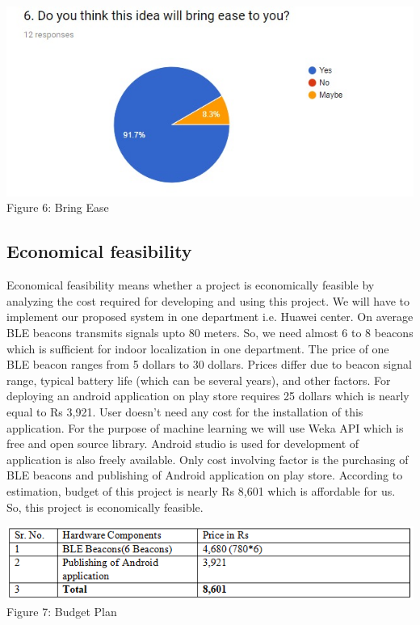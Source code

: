 \documentclass{article}
\begin{document}
\begin{center}
\includegraphics[scale=0.7]{graph6}
\\Figure 6: Bring Ease
\end{center}

 

\subsection{Economical feasibility}

Economical feasibility means whether a project is economically feasible by analyzing the cost required for developing and using this project. We will have to implement our proposed system in one department i.e. Huawei center. On average BLE beacons transmits signals upto 80 meters. So, we need almost 6 to 8 beacons which is sufficient for indoor localization in one department. The price of one BLE beacon ranges from 5 dollars to 30 dollars. Prices differ due to beacon signal range, typical battery life (which can be several years), and other factors. For deploying an android application on play store requires 25 dollars which is nearly equal to Rs 3,921. User doesn't need any cost for the installation of this application. For the purpose of machine learning we will use Weka API which is free and open source library. Android studio is used for development of application is also freely available. Only cost
involving factor is the purchasing of BLE beacons and publishing of Android application on play store. According to estimation, budget of this project is nearly Rs 8,601 which is affordable for us. So, this project is economically feasible.

\begin{center}
\includegraphics[scale=0.8]{table3}
\\Figure 7: Budget Plan
\end{center}
\end{document}
